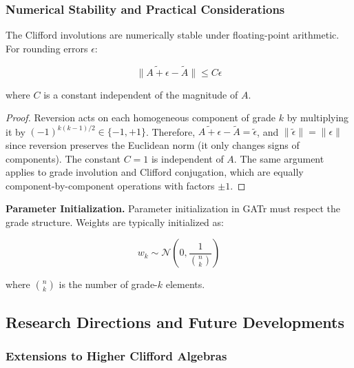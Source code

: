 \subsubsection{Numerical Stability and Practical Considerations}

\begin{proposition}\label{prop:estabilidad_numerica_involuciones}
The Clifford involutions are numerically stable under floating-point arithmetic. For rounding errors $\epsilon$:

\begin{equation}
    \|\widetilde{A + \epsilon} - \widetilde{A}\| \leq C\epsilon
\end{equation}

where $C$ is a constant independent of the magnitude of $A$.
\end{proposition}

\begin{proof}
Reversion acts on each homogeneous component of grade $k$ by multiplying it by $(-1)^{k(k-1)/2} \in \{-1, +1\}$. Therefore, $\widetilde{A + \epsilon} - \widetilde{A} = \widetilde{\epsilon}$, and $\|\widetilde{\epsilon}\| = \|\epsilon\|$ since reversion preserves the Euclidean norm (it only changes signs of components). The constant $C = 1$ is independent of $A$. The same argument applies to grade involution and Clifford conjugation, which are equally component-by-component operations with factors $\pm 1$.
\end{proof}

\textbf{Parameter Initialization.}\label{rem:inicializacion_parametros_ga} Parameter initialization in GATr must respect the grade structure. Weights are typically initialized as:

\begin{equation}
    w_k \sim \mathcal{N}\left(0, \frac{1}{\binom{n}{k}}\right)
\end{equation}

where $\binom{n}{k}$ is the number of grade-$k$ elements.

\subsection{Research Directions and Future Developments}

\subsubsection{Extensions to Higher Clifford Algebras}

